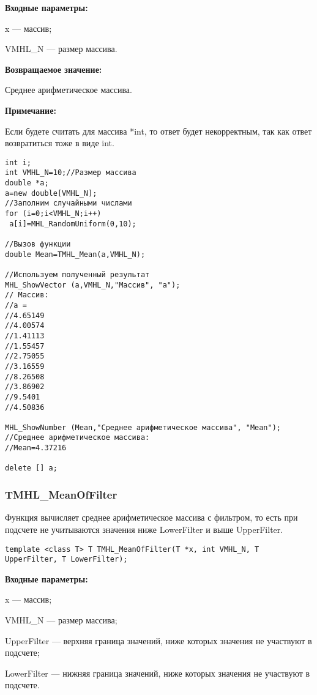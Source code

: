 \documentclass[a4paper,12pt]{article}
\begin{document}
\textbf{Входные параметры:}

 x --- массив;
 
 VMHL\_N --- размер массива.

\textbf{Возвращаемое значение:}

 Среднее арифметическое массива.
 
\textbf{Примечание:}

Если будете считать для массива *int, то ответ будет некорректным, так как ответ возвратиться тоже в виде int.
 



\begin{lstlisting}[label=code_use_TMHL_Mean,caption=Пример использования]
int i;
int VMHL_N=10;//Размер массива
double *a;
a=new double[VMHL_N];
//Заполним случайными числами
for (i=0;i<VMHL_N;i++)
 a[i]=MHL_RandomUniform(0,10);

//Вызов функции
double Mean=TMHL_Mean(a,VMHL_N);

//Используем полученный результат
MHL_ShowVector (a,VMHL_N,"Массив", "a");
// Массив:
//a =
//4.65149
//4.00574
//1.41113
//1.55457
//2.75055
//3.16559
//8.26508
//3.86902
//9.5401
//4.50836

MHL_ShowNumber (Mean,"Среднее арифметическое массива", "Mean");
//Среднее арифметическое массива:
//Mean=4.37216

delete [] a;
\end{lstlisting}

\subsubsection{TMHL\_MeanOfFilter}\label{TMHL_MeanOfFilter}

Функция вычисляет среднее арифметическое массива с фильтром, то есть при подсчете не учитываются значения ниже LowerFilter и выше UpperFilter.


\begin{lstlisting}[label=code_syntax_TMHL_MeanOfFilter,caption=Синтаксис]
template <class T> T TMHL_MeanOfFilter(T *x, int VMHL_N, T UpperFilter, T LowerFilter);
\end{lstlisting}

\textbf{Входные параметры:}

 x --- массив;
 
 VMHL\_N --- размер массива;
 
 UpperFilter --- верхняя граница значений, ниже которых значения не участвуют в подсчете;
 
 LowerFilter --- нижняя граница значений, ниже которых значения не участвуют в подсчете.
\end{document}
